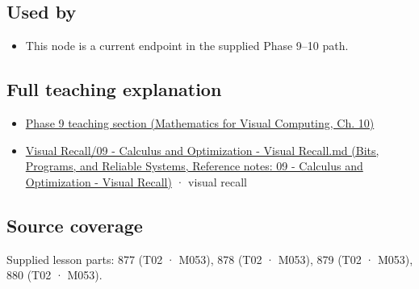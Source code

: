 \subsection{Used by}\label{appendix-2c2df8345991-used-by}

\begin{itemize}
\tightlist
\item
  This node is a current endpoint in the supplied Phase 9--10 path.
\end{itemize}

\subsection{Full teaching explanation}\label{appendix-2c2df8345991-full-teaching-explanation}

\begin{itemize}
\tightlist
\item
  \href{../02-Mathematics-for-Visual-Computing/main.pdf\#nameddest=02-foundations-ii-ch026-optimization-and-inverse-problems}{Phase 9 teaching section (Mathematics for Visual Computing, Ch. 10)}
\item
  \href{../01-Bits-Programs-and-Reliable-Systems/main.pdf\#nameddest=appendix-adf48f5dc5c1}{Visual Recall/09 - Calculus and Optimization - Visual Recall.md (Bits, Programs, and Reliable Systems, Reference notes: 09 - Calculus and Optimization - Visual Recall)} · visual recall
\end{itemize}

\subsection{Source coverage}\label{appendix-2c2df8345991-source-coverage}

Supplied lesson parts: 877 (T02 · M053), 878 (T02 · M053), 879 (T02 · M053), 880 (T02 · M053).
